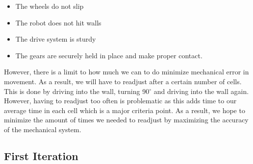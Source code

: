 \documentclass[11pt]{article}
\begin{document}
\begin{itemize}
\item The wheels do not slip
\item The robot does not hit walls
\item The drive system is sturdy 
\item The gears are securely held in place and make proper contact. 
\end{itemize}
However, there is a limit to how much we can to do minimize mechanical error in movement. As a result, we will have to readjust after a certain number of cells. This is done by driving into the wall, turning 90$^{\circ}$ and driving into the wall again. However, having to readjust too often is problematic as this adds time to our average time in each cell which is a major criteria point. As a result, we hope to minimize the amount of times we needed to readjust by maximizing the accuracy of the mechanical system. 
\newpage

\subsection{First Iteration}
\end{document}
